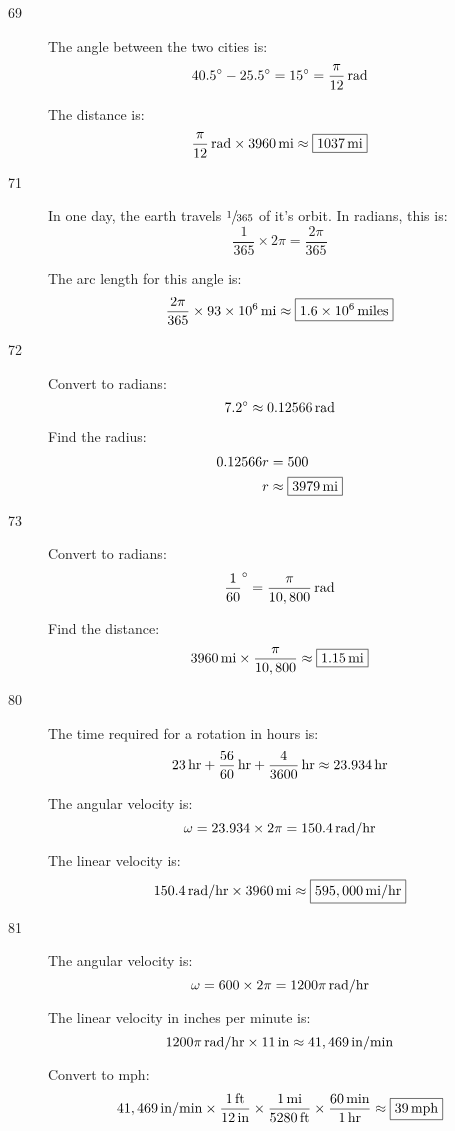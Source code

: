 \documentclass{exam}
\newcommand{\degree}{\ensuremath{^\circ}}
\begin{document}
\begin{description}
      \item[69]
        The angle between the two cities is: 
        \[
          40.5 \degree - 25.5 \degree = 15 \degree = \unit[ \frac{\pi}{12} ]{rad}
        \]

        The distance is:
        \[
          \unit[ \frac{\pi}{12} ]{rad} \times \unit[3960]{mi} \approx \boxed{ \unit[ 1037 ]{mi} }
        \]

      \item[71]
        In one day, the earth travels $\sfrac{1}{365}$ of it's orbit.  In radians, this is:
        \[
          \frac{1}{365} \times 2 \pi = \frac{2 \pi}{365}
        \]

        The arc length for this angle is:
        \[
          \frac{2 \pi}{365} \times \unit[ 93 \times 10^6 ]{mi} \approx \boxed{ \unit[1.6 \times 10^6]{miles} }
        \]

      \item[72]
        Convert to radians:
        \[
          7.2 \degree \approx \unit[0.12566]{rad}
        \]

        Find the radius:
        \begin{align*}
          0.12566 r & = 500 \\
          r         & \approx \boxed{ \unit[3979]{mi} } \\
        \end{align*}

      \item[73]
        Convert to radians:
        \[
          \frac{1}{60} \degree = \unit[ \frac{\pi}{10,800} ]{rad}
        \]

        Find the distance:
        \[
          \unit[ 3960 ]{mi} \times \frac{\pi}{10,800} \approx \boxed{ \unit[1.15]{mi} }
        \]

      \item[80]
        The time required for a rotation in hours is: 
        \[
          \unit[23]{hr} + \unit[ \frac{56}{60} ]{hr} + \unit[\frac{4}{3600}]{hr} \approx \unit[23.934]{hr}
        \]

        The angular velocity is:
        \[
          \omega = 23.934 \times 2 \pi = \unit[150.4]{rad/hr}
        \]

        The linear velocity is:
        \[
          \unit[150.4]{rad/hr} \times \unit[3960]{mi} \approx \boxed{ \unit[ 595,000 ]{mi/hr} }
        \]

      \item[81]
        The angular velocity is:
        \[
          \omega = 600 \times 2 \pi = \unit[1200 \pi]{rad/hr}
        \]

        The linear velocity in inches per minute is:
        \[
          \unit[1200 \pi]{rad/hr} \times \unit[11]{in} \approx \unit[41,469]{in/min}
        \]

        Convert to mph:
        \[
          \unit[41,469]{in/min} \times \frac{\unit[1]{ft}}{\unit[12]{in}} \times \frac{\unit[1]{mi}}{\unit[5280]{ft}} \times \frac{\unit[60]{min}}{\unit[1]{hr}} 
          \approx \boxed{ \unit[39]{mph} }
        \]


    \end{description}
\end{document}

